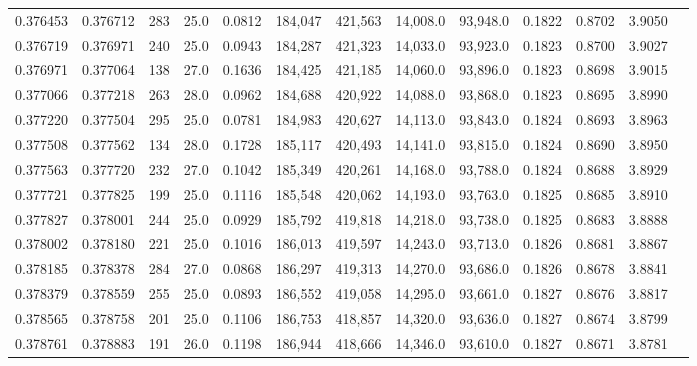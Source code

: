 \begin{tabular}{rrrrrrrrrrrrr}
0.376453 & 0.376712 &   283 & 25.0 &                                     0.0812 & 184,047 & 421,563 &  14,008.0 &  93,948.0 & 0.1822 & 0.8702 & 3.9050 \\
0.376719 & 0.376971 &   240 & 25.0 &                                     0.0943 & 184,287 & 421,323 &  14,033.0 &  93,923.0 & 0.1823 & 0.8700 & 3.9027 \\
0.376971 & 0.377064 &   138 & 27.0 &                                     0.1636 & 184,425 & 421,185 &  14,060.0 &  93,896.0 & 0.1823 & 0.8698 & 3.9015 \\
0.377066 & 0.377218 &   263 & 28.0 &                                     0.0962 & 184,688 & 420,922 &  14,088.0 &  93,868.0 & 0.1823 & 0.8695 & 3.8990 \\
0.377220 & 0.377504 &   295 & 25.0 &                                     0.0781 & 184,983 & 420,627 &  14,113.0 &  93,843.0 & 0.1824 & 0.8693 & 3.8963 \\
0.377508 & 0.377562 &   134 & 28.0 &                                     0.1728 & 185,117 & 420,493 &  14,141.0 &  93,815.0 & 0.1824 & 0.8690 & 3.8950 \\
0.377563 & 0.377720 &   232 & 27.0 &                                     0.1042 & 185,349 & 420,261 &  14,168.0 &  93,788.0 & 0.1824 & 0.8688 & 3.8929 \\
0.377721 & 0.377825 &   199 & 25.0 &                                     0.1116 & 185,548 & 420,062 &  14,193.0 &  93,763.0 & 0.1825 & 0.8685 & 3.8910 \\
0.377827 & 0.378001 &   244 & 25.0 &                                     0.0929 & 185,792 & 419,818 &  14,218.0 &  93,738.0 & 0.1825 & 0.8683 & 3.8888 \\
0.378002 & 0.378180 &   221 & 25.0 &                                     0.1016 & 186,013 & 419,597 &  14,243.0 &  93,713.0 & 0.1826 & 0.8681 & 3.8867 \\
0.378185 & 0.378378 &   284 & 27.0 &                                     0.0868 & 186,297 & 419,313 &  14,270.0 &  93,686.0 & 0.1826 & 0.8678 & 3.8841 \\
0.378379 & 0.378559 &   255 & 25.0 &                                     0.0893 & 186,552 & 419,058 &  14,295.0 &  93,661.0 & 0.1827 & 0.8676 & 3.8817 \\
0.378565 & 0.378758 &   201 & 25.0 &                                     0.1106 & 186,753 & 418,857 &  14,320.0 &  93,636.0 & 0.1827 & 0.8674 & 3.8799 \\
0.378761 & 0.378883 &   191 & 26.0 &                                     0.1198 & 186,944 & 418,666 &  14,346.0 &  93,610.0 & 0.1827 & 0.8671 & 3.8781 \\

\end{tabular}
